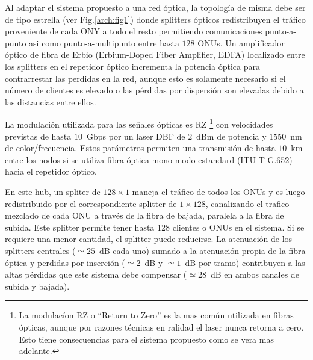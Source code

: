 
Al adaptar el sistema propuesto a una red óptica, la topología de misma debe ser de tipo estrella (ver Fig.\ref{arch:fig1}) donde splitters ópticos redistribuyen el tráfico proveniente de cada ONY a todo el resto permitiendo comunicaciones punto-a-punto asi como punto-a-multipunto entre hasta $128$ ONUs.
Un amplificador óptico de fibra de Erbio (Erbium-Doped Fiber Amplifier, EDFA) localizado entre los splitters en el repetidor óptico incrementa la potencia óptica para contrarrestar las perdidas en la red, aunque esto es solamente necesario si el número de clientes es elevado o las pérdidas por dispersión son elevadas debido a las distancias entre ellos.

La modulación utilizada para las señales ópticas es RZ \footnote{La modulacíon RZ o ``Return to Zero'' es la mas común utilizada en fibras ópticas, aunque por razones técnicas en ralidad el laser nunca retorna a cero. Esto tiene consecuencias para el sistema propuesto como se vera mas adelante.} con velocidades previstas de hasta $10$~Gbps por un laser DBF de $2$~dBm de potencia y $1550$~nm de color/frecuencia. Estos parámetros permiten una transmisión de hasta $10$~km entre los nodos si se utiliza fibra óptica mono-modo estandard (ITU-T G.652) hacia el repetidor óptico.

En este hub, un spliter de $128\times 1$ maneja el tráfico de todos los ONUs y es luego redistribuido por el correspondiente splitter de $1\times 128$, canalizando el trafico mezclado de cada ONU a través de la fibra de bajada, paralela a la fibra de subida. Este splitter permite tener hasta 128 clientes o ONUs en el sistema. Si se requiere una menor cantidad, el splitter puede reducirse.
La atenuación de los splitters centrales ($\simeq25$~dB cada uno) sumado a la atenuación propia de la fibra óptica y perdidas por inserción ($\simeq2$~dB y $\simeq1$~dB por tramo) contribuyen a las altas pérdidas que este sistema debe compensar ($\simeq28$~dB en ambos canales de subida y bajada).

